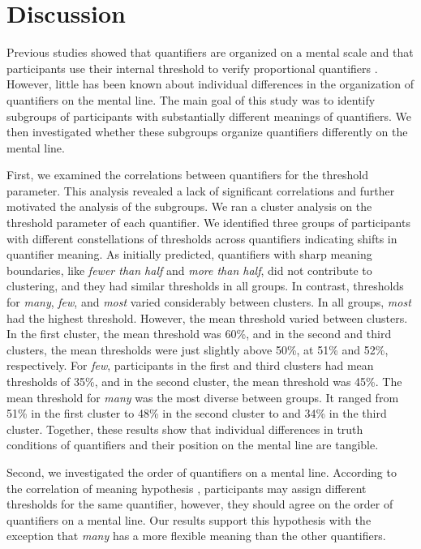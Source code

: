 \documentclass{article}
\begin{document}
\section{Discussion}
Previous studies showed that quantifiers are organized on a mental scale \cite{Hammerton1976HowPart, Pezzelle2018} and that participants use their internal threshold to verify proportional quantifiers \cite{Shikhare2015ProcessingQuantifiers}. However, little has been known about individual differences in the organization of quantifiers on the mental line. The main goal of this study was to identify subgroups of participants with substantially different meanings of quantifiers. We then investigated whether these subgroups organize quantifiers differently on the mental line. 

First, we examined the correlations between quantifiers for the threshold parameter. This analysis revealed %
a lack of significant correlations and further motivated the analysis of the subgroups. We ran a cluster analysis on the threshold parameter of each quantifier. We identified three groups of participants with different constellations of thresholds across quantifiers indicating shifts in quantifier meaning. As initially predicted, quantifiers with sharp meaning boundaries, like \textit{fewer than half} and \textit{more than half}, did not contribute to clustering, and they had similar thresholds in all groups. In contrast, thresholds for \textit{many}, \textit{few}, and \textit{most} varied considerably between clusters. In all groups, \textit{most} had the highest threshold. However, the mean threshold varied between clusters. In the first cluster, the mean threshold was 60\%, and in the second and third clusters, the mean thresholds were just slightly above 50\%, at 51\% and 52\%, respectively. For \textit{few}, participants in the first and third clusters had mean thresholds of 35\%, and in the second cluster, the mean threshold was 45\%. The mean threshold for \textit{many} was the most diverse between groups. It ranged from 51\% in the first cluster to 48\% in the second cluster to and 34\% in the third cluster. Together, these results show that individual differences in truth conditions of quantifiers and their position on the mental line are tangible. 

Second, we investigated the order of quantifiers on a mental line. According to the correlation of meaning hypothesis \cite{Douven2019naturalconcepts}, participants may assign different thresholds for the same quantifier, however, they should agree on the order of quantifiers on a mental line. Our results support this hypothesis with the exception that \textit{many} has a more flexible meaning than the other quantifiers.
\end{document}
